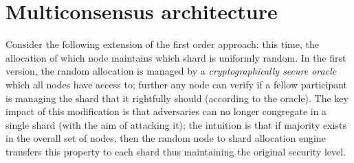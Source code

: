 \documentclass{article}
\begin{document}

\section{Multiconsensus architecture}
Consider the following extension of the first order approach: this time, the allocation of which node maintains which shard is uniformly random. In the first version, the random allocation is managed  by a {\em cryptographically secure oracle} which all nodes have access to; further any node can verify if a fellow participant is managing the shard that it rightfully should (according to the oracle).   The key impact of this modification is that adversaries can no longer congregate in a single shard (with the aim of attacking it); the intuition is that if majority exists in the overall set of nodes, then the random node to shard allocation engine transfers this property to each shard thus maintaining the original security level.
\end{document}

